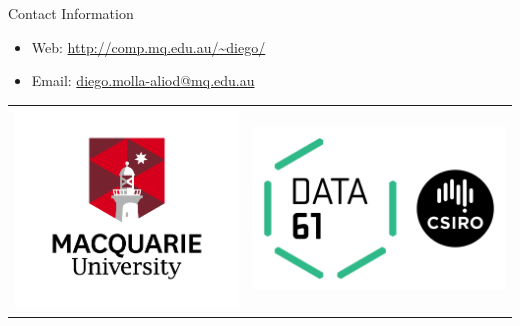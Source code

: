 \documentclass[final]{beamer}
\newlength{\onecolwid}
\begin{document}
\begin{frame}[t]
\begin{columns}[t]
\begin{column}{\onecolwid}
\vspace{-1cm}

\begin{alertblock}{Contact Information}

\begin{itemize}
\item Web: \href{http://comp.mq.edu.au/~diego/}{http://comp.mq.edu.au/\~{}diego/}
\item Email: \href{mailto:diego.molla-aliod@mq.edu.au}{diego.molla-aliod@mq.edu.au}
\end{itemize}

\end{alertblock}

\vspace{-1.5cm}
\begin{center}
\begin{tabular}{cc}
\includegraphics[align=t,width=0.3\linewidth]{Macquarie.png}
&
\includegraphics[align=t,width=0.3\linewidth]{data61.png}
\end{tabular}
\end{center}

\end{column}

\end{columns} %

\end{frame} %
\end{document}
